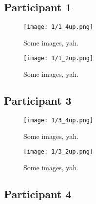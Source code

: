 \clearpage

\subsection{Participant 1}

\begin{figure}[h]
	\begin{center}
	\texttt{[image: 1/1\_4up.png]}
	\caption{Some images, yah.}
	\end{center}
\end{figure}

\clearpage

\begin{figure}[h]
	\begin{center}
	\texttt{[image: 1/1\_2up.png]}
	\caption{Some images, yah.}
	\end{center}
\end{figure}


\clearpage

\subsection{Participant 3}

\begin{figure}[h]
	\begin{center}
	\texttt{[image: 1/3\_4up.png]}
	\caption{Some images, yah.}
	\end{center}
\end{figure}

\clearpage

\begin{figure}[h]
	\begin{center}
	\texttt{[image: 1/3\_2up.png]}
	\caption{Some images, yah.}
	\end{center}
\end{figure}


\clearpage

\subsection{Participant 4}

